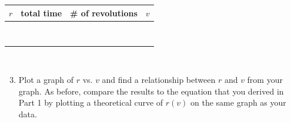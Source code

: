 \documentclass[11pt,letterpaper]{article}
\begin{document}
%
\begin{tabularx}{\linewidth}{|Y|Y|Y|Y|}
\hline
$r$ & total time & \# of revolutions & $v$\\
\hline\vspace{2cm}&\vspace{2cm}&\vspace{2cm}&\vspace{2cm}\\
\vspace{2cm}&\vspace{2cm}&\vspace{2cm}&\vspace{2cm}\\
\hline\vspace{2cm}&\vspace{2cm}&\vspace{2cm}&\vspace{2cm}\\
\vspace{2cm}&\vspace{2cm}&\vspace{2cm}&\vspace{2cm}\\
\hline\vspace{2cm}&\vspace{2cm}&\vspace{2cm}&\vspace{2cm}\\
\vspace{2cm}&\vspace{2cm}&\vspace{2cm}&\vspace{2cm}\\
\hline\vspace{2cm}&\vspace{2cm}&\vspace{2cm}&\vspace{2cm}\\
\vspace{2cm}&\vspace{2cm}&\vspace{2cm}&\vspace{2cm}\\
\hline
\end{tabularx}\\

\begin{enumerate}
\setcounter{enumi}{2}
\item Plot a graph of $r$ vs. $v$ and find a relationship between $r$ and
    $v$ from your graph. As before, compare the results to the equation that you derived in Part 1 by plotting a theoretical curve of $r(v)$ on the same graph as your data.
\end{enumerate}
\end{document}
